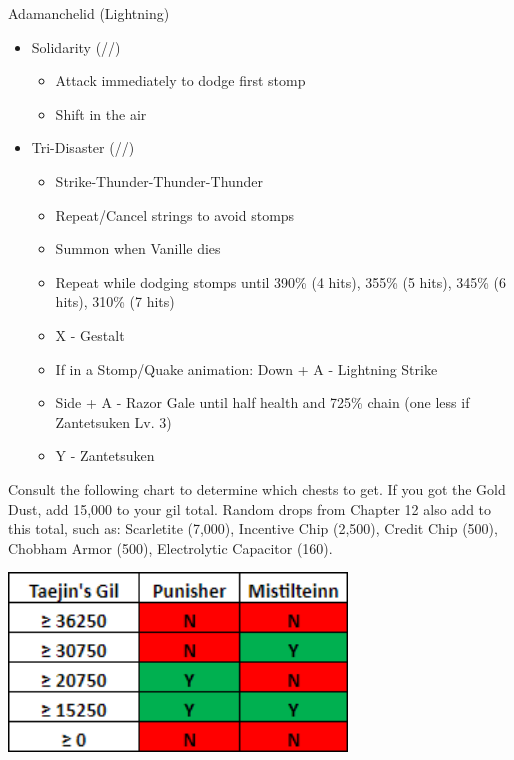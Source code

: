 \begin{battle}[0:45]{Adamanchelid (Lightning)}
	\renewcommand{\first}{[1] Solidarity (\com/\sen/\med)}
	\renewcommand{\second}{[2] Tri-Disaster (\rav/\rav/\rav)}
	\begin{itemize}
		\item \first
		      \begin{itemize}
			      \item Attack immediately to dodge first stomp
			      \item Shift in the air
		      \end{itemize}
		\item \second
		      \begin{itemize}
			      \item Strike-Thunder-Thunder-Thunder
			      \item Repeat/Cancel strings to avoid stomps
			      \item Summon when Vanille dies
			      \item Repeat while dodging stomps until 390\% (4 hits), 355\% (5 hits), 345\% (6 hits), 310\% (7 hits)
			      \item X - Gestalt
			      \item If in a Stomp/Quake animation: Down + A - Lightning Strike
			      \item Side + A - Razor Gale until half health and 725\% chain (one less if Zantetsuken Lv. 3)
			      \item Y - Zantetsuken
		      \end{itemize}
	\end{itemize}
\end{battle}

Consult the following chart to determine which chests to get. If you got the Gold Dust, add 15,000 to your gil total. Random drops from Chapter 12 also add to this total, such as: Scarletite (7,000), Incentive Chip (2,500), Credit Chip (500), Chobham Armor (500), Electrolytic Capacitor (160).

\begingroup
\includegraphics[width=9cm]{./Chapters/gil_pickups.png}
\endgroup

